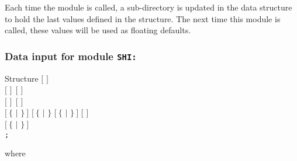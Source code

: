 Each time the  module is called, a sub-directory is updated in the
 data structure to hold the last values defined in the
 structure. The next time this module is called,
these values will be used as floating defaults.

\subsubsection{Data input for module {\tt SHI:}}\label{sect:descshi}

\begin{DataStructure}{Structure }
$[$   $]$ \\
$[$    $]~~[$    $]$ \\
$[$   $]~~[$    $]$  \\
$[~\{$  $|$  $\}~]$ $[~\{$  $|$  $\}$
$[~\{$  $|$  $\}~]$
$[$   $]$ \\
$[~\{$  $|$  $\}~]$ \\
{\tt ;}
\end{DataStructure}

\noindent  where

